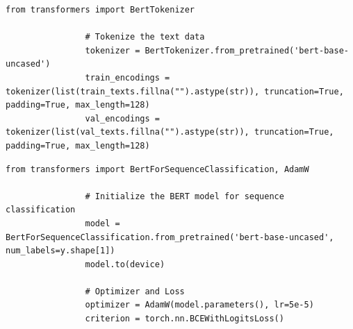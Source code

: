             \vspace{0.5em}
            
            \begin{lstlisting}[caption={Tokenize text data using BERT tokenizer}, label={lst:bert_tokenizer}]
                from transformers import BertTokenizer

                # Tokenize the text data
                tokenizer = BertTokenizer.from_pretrained('bert-base-uncased')
                train_encodings = tokenizer(list(train_texts.fillna("").astype(str)), truncation=True, padding=True, max_length=128)
                val_encodings = tokenizer(list(val_texts.fillna("").astype(str)), truncation=True, padding=True, max_length=128)
            \end{lstlisting}
            
            \vspace{0.5em}
            
            \begin{lstlisting}[caption={Initialize BERT model for sequence classification}, label={lst:bert_model}]
                from transformers import BertForSequenceClassification, AdamW

                # Initialize the BERT model for sequence classification
                model = BertForSequenceClassification.from_pretrained('bert-base-uncased', num_labels=y.shape[1])
                model.to(device)

                # Optimizer and Loss
                optimizer = AdamW(model.parameters(), lr=5e-5)
                criterion = torch.nn.BCEWithLogitsLoss()
            \end{lstlisting}
            
            \vspace{0.5em}
            
